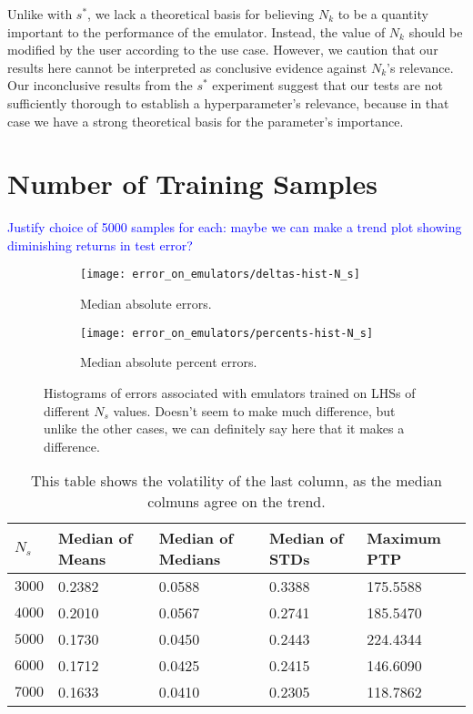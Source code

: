 Unlike with $s^*$, we lack a theoretical basis for believing $N_k$ to be a
quantity important to the performance of the emulator. Instead, the value of
$N_k$ should be modified by the user according to the use case. However, we
caution that our results here cannot be interpreted as conclusive evidence
against $N_k$'s relevance. Our inconclusive results from the $s^*$ experiment
suggest that our tests are not sufficiently thorough to establish a
hyperparameter's relevance, because in that case we have a strong theoretical
basis for the parameter's importance.

\section{Number of Training Samples}
\label{sec: num_samples}

\textcolor{blue}{Justify choice of 5000 samples for each: maybe we can make a
trend plot showing diminishing returns in test error?}

\begin{figure}[ht!]
    \begin{subfigure}{0.35 \textheight}
    \centering
 		\texttt{[image: error\_on\_emulators/deltas-hist-N\_s]}
 		\caption{Median absolute errors.}
 		\label{fig: Ns_experiment_deltas}
    \end{subfigure}
    \begin{subfigure}{0.35 \textheight}
    \centering
 		\texttt{[image: error\_on\_emulators/percents-hist-N\_s]}
 		\caption{Median absolute percent errors.}
 		\label{fig: Ns_experiment_percerr}
    \end{subfigure}
        \centering
    \caption[Impact of $s^*$ on Accuracy]
    		{Histograms of errors associated with emulators trained on LHSs of
    			different $N_s$ values. Doesn't seem to make much difference,
    			but unlike the other cases, we can definitely say here that it
    			makes a difference.}
    \label{fig: Ns_experiment}
\end{figure}

\begin{table}[ht!]
\centering
\begin{tabular}{l|l|l|l|l}
\hline
$N_s$ & Median of Means & Median of Medians & Median of STDs & Maximum PTP \\ \hline
$3000$ & 0.2382 & 0.0588 & 0.3388 & 175.5588 \\
$4000$ & 0.2010 & 0.0567 & 0.2741 & 185.5470 \\
$5000$ & 0.1730 & 0.0450 & 0.2443 & 224.4344 \\
$6000$ & 0.1712 & 0.0425 & 0.2415 & 146.6090 \\
$7000$ & 0.1633 & 0.0410 & 0.2305 & 118.7862 \\
\end{tabular}
	\cprotect\caption[$N_s$ Experiment: Deltas Statistics]{This table shows
		the volatility of the last column, as the median colmuns agree on the
		trend.}
 \label{tab: Ns_experiment_deltas_stats}
\end{table}

